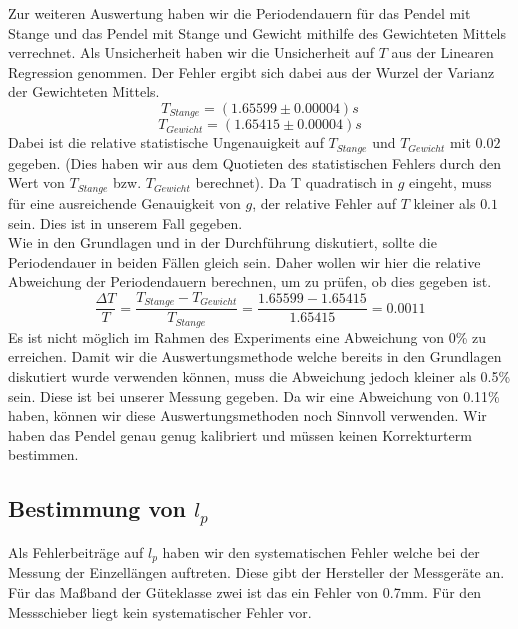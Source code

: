 \documentclass[twoside]{protokoll}
\begin{document}
Zur weiteren Auswertung haben wir die Periodendauern für das Pendel mit Stange und das Pendel mit Stange und Gewicht mithilfe des Gewichteten Mittels verrechnet.
Als Unsicherheit haben wir die Unsicherheit auf $T$ aus der Linearen Regression genommen.
Der Fehler ergibt sich dabei aus der Wurzel der Varianz der Gewichteten Mittels.
\begin{equation}
    T_{Stange} = (1.65599 \pm 0.00004)s
\end{equation}
\begin{equation}
    T_{Gewicht} = (1.65415 \pm 0.00004)s
\end{equation}
Dabei ist die relative statistische Ungenauigkeit auf $T_{Stange}$ und $T_{Gewicht}$ mit $0.02$\textperthousand \quad gegeben. (Dies haben wir aus dem Quotieten des statistischen Fehlers durch den Wert von $T_{Stange}$ bzw. $T_{Gewicht}$ berechnet).
Da T quadratisch in $g$ eingeht, muss für eine ausreichende Genauigkeit von $g$, der relative Fehler auf  $T$ kleiner als $0.1$ \textperthousand sein.
Dies ist in unserem Fall gegeben.\\

Wie in den Grundlagen und in der Durchführung diskutiert, sollte die Periodendauer in beiden Fällen gleich sein.
Daher wollen wir hier die relative Abweichung der Periodendauern berechnen, um zu prüfen, ob dies gegeben ist.
\begin{equation}
    \frac{\Delta T}{T} = \frac{T_{Stange} - T_{Gewicht}}{T_{Stange}} = \frac{1.65599 - 1.65415}{1.65415} = 0.0011
\end{equation}
Es ist nicht möglich im Rahmen des Experiments eine Abweichung von 0\% zu erreichen.
Damit wir die Auswertungsmethode welche bereits in den Grundlagen diskutiert wurde verwenden können, muss die Abweichung jedoch kleiner als 0.5\% sein. 
Diese ist bei unserer Messung gegeben. 
Da wir eine Abweichung von 0.11\% haben, können wir diese Auswertungsmethoden noch Sinnvoll verwenden. 
Wir haben das Pendel genau genug kalibriert und müssen keinen Korrekturterm bestimmen.\\

 
\subsection{Bestimmung von $l_p$}

Als Fehlerbeiträge auf $l_p$ haben wir den systematischen Fehler welche bei der Messung der Einzellängen auftreten.
Diese gibt der Hersteller der Messgeräte an. 
Für das Maßband der Güteklasse zwei ist das ein Fehler von 0.7mm. 
Für den Messschieber liegt kein systematischer Fehler vor.
\end{document}

